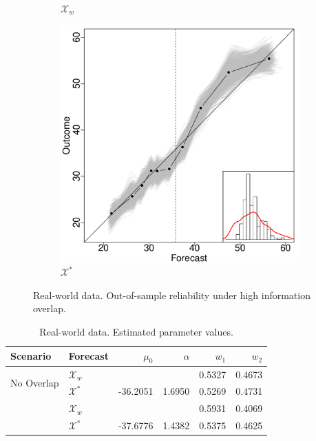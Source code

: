 \documentclass[11pt]{article}
\theoremstyle{definition}
\theoremstyle{definition}
\begin{document}
\begin{figure}[H]
\begin{subfigure}[b]{0.323\textwidth}
                \caption{$\mathcal{X}_w$}
                \label{fig:gull}
        \end{subfigure}%
        \begin{subfigure}[b]{0.323\textwidth}
                \includegraphics[width=\textwidth]{DependentE-OLP.pdf}
                \caption{$\mathcal{X}^*$}
                \label{DepEOLPConrete}
        \end{subfigure}
          \caption{Real-world data. Out-of-sample reliability under high information overlap. }
               \label{RelDiagramHigh}
\end{figure}



\begin{table}[ht]
\centering
\caption{Real-world data. Estimated parameter values.} 
\begin{tabular}{llrrrr}
   \hline \hline
Scenario & Forecast & $\mu_0$ & $\alpha$ & $w_1$ & $w_2$\\
  \hline
\multirow{2}{*}{No Overlap} & $\mathcal{X}_w$ &  &  & 0.5327 & 0.4673 \\ 
&  $\mathcal{X}^*$ & -36.2051 & 1.6950 & 0.5269 & 0.4731 \\  \rule{0pt}{2.9ex} 
\hspace{-0.2em}\multirow{2}{*}{High Overlap}  & $\mathcal{X}_w$ &  &  & 0.5931 & 0.4069 \\ 
 & $\mathcal{X}^*$ & -37.6776 & 1.4382 & 0.5375 & 0.4625 \\ 
   \hline
\end{tabular}
\label{NoParamsReal}
\end{table}
\end{document}

